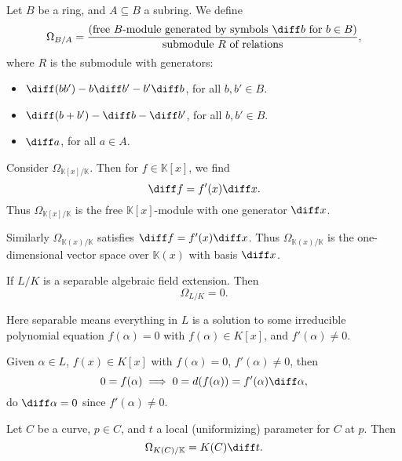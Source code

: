 \documentclass[12pt]{article}
\begin{document}
\begin{definition}
	Let $B$ be a ring, and $A \subseteq B$ a subring. We define
	\[
		\Omega_{B/A} = \frac{(\text{free $B$-module generated by symbols $\diff b$ for $b \in B$})}{\text{submodule $R$ of relations}},
	\]
	where $R$ is the submodule with generators:
	\begin{itemize}
		\item $\diff (b b') - b \diff b' - b' \diff b$, for all $b, b' \in B$.
		\item $\diff (b + b') - \diff b - \diff b'$, for all $b, b' \in B$.
		\item $\diff a$, for all $a \in A$.
	\end{itemize}
	
\end{definition}


\begin{exbox}
	Consider $\Omega_{\mathbb{K}[x]/\mathbb{K}}$. Then for $f \in \mathbb{K}[x]$, we find
	\[
	\diff f = f'(x) \diff x.
	\]
	Thus $\Omega_{\mathbb{K}[x]/\mathbb{K}}$ is the free $\mathbb{K}[x]$-module with one generator $\diff x$.

	Similarly $\Omega_{\mathbb{K}(x)/\mathbb{K}}$ satisfies $\diff f = f'(x) \diff x$. Thus $\Omega_{\mathbb{K}(x)/\mathbb{K}}$ is the one-dimensional vector space over $\mathbb{K}(x)$ with basis $\diff x$.
\end{exbox}

\begin{proposition}
	If $L/K$ is a separable algebraic field extension. Then
	\[
	\Omega_{L/K} = 0.
	\]
\end{proposition}

Here separable means everything in $L$ is a solution to some irreducible polynomial equation $f(\alpha) = 0$ with $f(\alpha) \in K[x]$, and $f'(\alpha) \neq 0$.

\begin{proofbox}
	Given $\alpha \in L$, $f(x) \in K[x]$ with $f(\alpha) = 0$, $f'(\alpha) \neq 0$, then
	\[
	0 = f(\alpha) \implies 0 = d(f(\alpha)) = f'(\alpha) \diff \alpha,
	\]
	do $\diff \alpha = 0$ since $f'(\alpha) \neq 0$.
\end{proofbox}

\begin{lemma}
	Let $C$ be a curve, $p \in C$, and $t$ a local (uniformizing) parameter for $C$ at $p$. Then
	\[
	\Omega_{K(C)/\mathbb{K}} = K(C) \diff t.
	\]
\end{lemma}
\end{document}
